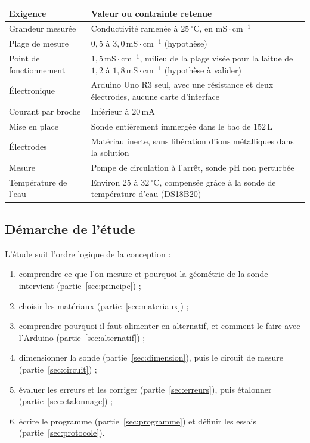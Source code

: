\documentclass[11pt,a4paper]{article}
\newcommand{\ligne}{\arrayrulecolor{ligneENO}\specialrule{0.4pt}{0pt}{0pt}\arrayrulecolor{black}}
\newcommand{\U}[1]{\,\mathrm{#1}}
\begin{document}
\begin{center}
\begin{tabularx}{\linewidth}{>{\raggedright\arraybackslash}p{4.6cm} >{\raggedright\arraybackslash}X}
\toprule
\textbf{Exigence} & \textbf{Valeur ou contrainte retenue} \\
\midrule
Grandeur mesurée & Conductivité ramenée à $25\U{{}^{\circ}C}$, en $\mathrm{mS \cdot cm^{-1}}$ \\ \ligne
Plage de mesure & $0{,}5$ à $3{,}0\U{mS \cdot cm^{-1}}$ (hypothèse) \\ \ligne
Point de fonctionnement & $1{,}5\U{mS \cdot cm^{-1}}$, milieu de la plage visée pour la laitue de $1{,}2$ à $1{,}8\U{mS \cdot cm^{-1}}$ (hypothèse à valider) \\ \ligne
Électronique & Arduino Uno R3 seul, avec une résistance et deux électrodes, aucune carte d'interface \\ \ligne
Courant par broche & Inférieur à $20\U{mA}$ \\ \ligne
Mise en place & Sonde entièrement immergée dans le bac de $152\U{L}$ \\ \ligne
Électrodes & Matériau inerte, sans libération d'ions métalliques dans la solution \\ \ligne
Mesure & Pompe de circulation à l'arrêt, sonde pH non perturbée \\ \ligne
Température de l'eau & Environ $25$ à $32\U{{}^{\circ}C}$, compensée grâce à la sonde de température d'eau (DS18B20) \\
\bottomrule
\end{tabularx}
\end{center}

\subsection{Démarche de l'étude}

L'étude suit l'ordre logique de la conception :
\begin{enumerate}[nosep]
\item comprendre ce que l'on mesure et pourquoi la géométrie de la sonde intervient (partie~\ref{sec:principe}) ;
\item choisir les matériaux (partie~\ref{sec:materiaux}) ;
\item comprendre pourquoi il faut alimenter en alternatif, et comment le faire avec l'Arduino (partie~\ref{sec:alternatif}) ;
\item dimensionner la sonde (partie~\ref{sec:dimension}), puis le circuit de mesure (partie~\ref{sec:circuit}) ;
\item évaluer les erreurs et les corriger (partie~\ref{sec:erreurs}), puis étalonner (partie~\ref{sec:etalonnage}) ;
\item écrire le programme (partie~\ref{sec:programme}) et définir les essais (partie~\ref{sec:protocole}).
\end{enumerate}
\end{document}
